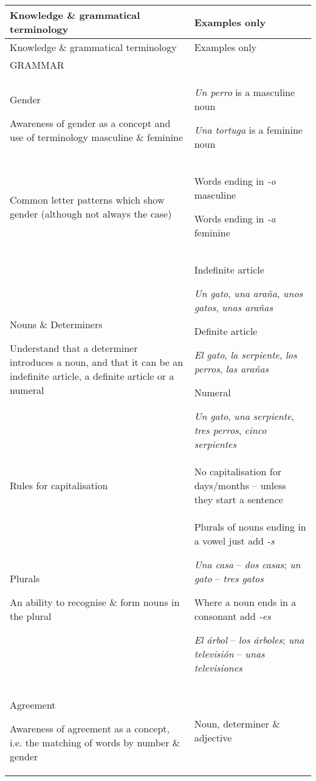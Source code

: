 \documentclass[output=paper]{langscibook}
\begin{document}
\bigskip
\noindent
\begin{longtable}{ *2{p{}} }
\lsptoprule Knowledge \& grammatical terminology & Examples only\\\midrule\endfirsthead
\midrule Knowledge \& grammatical terminology & Examples only\\\midrule\endhead
\endfoot\lspbottomrule\endlastfoot
GRAMMAR	&\\
\tablevspace
Gender

Awareness of gender as a concept and use of terminology masculine \& feminine &	\textit{Un perro} is a masculine noun

\textit{Una tortuga} is a feminine noun\\
\tablevspace
Common letter patterns which show gender
(although not always the case) & Words ending in \textit{-o} masculine

Words ending in \textit{-a} feminine\\
\tablevspace
Nouns \& Determiners

Understand that a determiner introduces a noun, and that it can be an indefinite article, a definite article or a numeral & Indefinite article

\textit{Un gato}, \textit{una araña}, \textit{unos gatos}, \textit{unas arañas}

Definite article

\textit{El gato}, \textit{la serpiente}, \textit{los perros}, \textit{las arañas}

Numeral

\textit{Un gato}, \textit{una serpiente}, \textit{tres perros}, \textit{cinco serpientes}\\
\tablevspace
Rules for capitalisation &	No capitalisation for days/months -- unless they start a sentence\\

Plurals

An ability to recognise \& form nouns in the plural & Plurals of nouns ending in a vowel just add \textit{-s}

\textit{Una casa} -- \textit{dos casas}; \textit{un gato} -- \textit{tres gatos}

Where a noun ends in a consonant add \textit{-es}

\textit{El árbol} -- \textit{los árboles}; \textit{una televisión} -- \textit{unas televisiones}\\

Agreement

Awareness of agreement as a concept, i.e. the matching of words by number \& gender & Noun, determiner \& adjective


\end{longtable}
\end{document}
